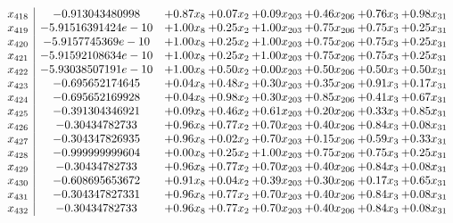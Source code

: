 \documentclass[8pt]{article}
\begin{document}
\[\begin{array}{c| c c@{\hskip 2pt} c@{\hskip 2pt} c@{\hskip 2pt} c@{\hskip 2pt} c@{\hskip 2pt} c@{\hskip 2pt} }
 x_{418}   &  -0.913043480998 & +  0.87 x_{8} & +  0.07 x_{2} & +  0.09 x_{203} & +  0.46 x_{206} & +  0.76 x_{3} & +  0.98 x_{31}\\
 x_{419}   &  -5.91516391424e-10 & +  1.00 x_{8} & +  0.25 x_{2} & +  1.00 x_{203} & +  0.75 x_{206} & +  0.75 x_{3} & +  0.25 x_{31}\\
 x_{420}   &  -5.9157745369e-10 & +  1.00 x_{8} & +  0.25 x_{2} & +  1.00 x_{203} & +  0.75 x_{206} & +  0.75 x_{3} & +  0.25 x_{31}\\
 x_{421}   &  -5.91592108634e-10 & +  1.00 x_{8} & +  0.25 x_{2} & +  1.00 x_{203} & +  0.75 x_{206} & +  0.75 x_{3} & +  0.25 x_{31}\\
 x_{422}   &  -5.93038507191e-10 & +  1.00 x_{8} & +  0.50 x_{2} & +  0.00 x_{203} & +  0.50 x_{206} & +  0.50 x_{3} & +  0.50 x_{31}\\
 x_{423}   &  -0.695652174645 & +  0.04 x_{8} & +  0.48 x_{2} & +  0.30 x_{203} & +  0.35 x_{206} & +  0.91 x_{3} & +  0.17 x_{31}\\
 x_{424}   &  -0.695652169928 & +  0.04 x_{8} & +  0.98 x_{2} & +  0.30 x_{203} & +  0.85 x_{206} & +  0.41 x_{3} & +  0.67 x_{31}\\
 x_{425}   &  -0.391304346921 & +  0.09 x_{8} & +  0.46 x_{2} & +  0.61 x_{203} & +  0.20 x_{206} & +  0.33 x_{3} & +  0.85 x_{31}\\
 x_{426}   &  -0.30434782733 & +  0.96 x_{8} & +  0.77 x_{2} & +  0.70 x_{203} & +  0.40 x_{206} & +  0.84 x_{3} & +  0.08 x_{31}\\
 x_{427}   &  -0.304347826935 & +  0.96 x_{8} & +  0.02 x_{2} & +  0.70 x_{203} & +  0.15 x_{206} & +  0.59 x_{3} & +  0.33 x_{31}\\
 x_{428}   &  -0.999999999604 & +  0.00 x_{8} & +  0.25 x_{2} & +  1.00 x_{203} & +  0.75 x_{206} & +  0.75 x_{3} & +  0.25 x_{31}\\
 x_{429}   &  -0.30434782733 & +  0.96 x_{8} & +  0.77 x_{2} & +  0.70 x_{203} & +  0.40 x_{206} & +  0.84 x_{3} & +  0.08 x_{31}\\
 x_{430}   &  -0.608695653672 & +  0.91 x_{8} & +  0.04 x_{2} & +  0.39 x_{203} & +  0.30 x_{206} & +  0.17 x_{3} & +  0.65 x_{31}\\
 x_{431}   &  -0.304347827331 & +  0.96 x_{8} & +  0.77 x_{2} & +  0.70 x_{203} & +  0.40 x_{206} & +  0.84 x_{3} & +  0.08 x_{31}\\
 x_{432}   &  -0.30434782733 & +  0.96 x_{8} & +  0.77 x_{2} & +  0.70 x_{203} & +  0.40 x_{206} & +  0.84 x_{3} & +  0.08 x_{31}\\

\end{array}\]
\end{document}
